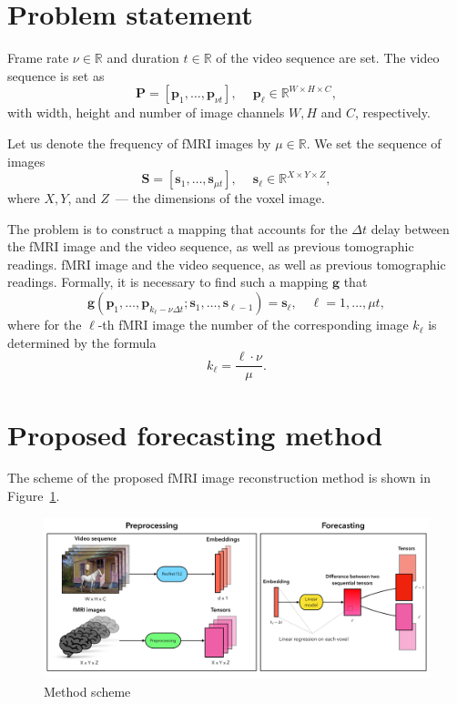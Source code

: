 \documentclass[sn-mathphys-num]{sn-jnl}%
\theoremstyle{thmstyleone}%
\theoremstyle{thmstyletwo}%
\theoremstyle{thmstylethree}%
\begin{document}
\section{Problem statement}

Frame rate $\nu \in \mathbb{R}$ and duration $t \in \mathbb{R}$ of the video sequence are set. The video sequence is set as
\begin{equation*}
	\label{eq1}
	\mathbf{P} = [\mathbf{p}_1, \ldots, \mathbf{p}_{\nu t}], \quad\
	\mathbf{p}_{\ell} \in \mathbb{R}^{W \times H \times C},
\end{equation*}
with width, height and number of image channels $W, H$ and $C$, respectively.

Let us denote the frequency of fMRI images by $\mu \in \mathbb{R}$. We set the sequence of images
\begin{equation*}
	\label{eq2}
	\mathbf{S} = [\mathbf{s}_1, \ldots, \mathbf{s}_{\mu t}], \quad\
	\mathbf{s}_{\ell} \in \mathbb{R}^{X \times Y \times Z},
\end{equation*}
where $X, Y$, and $Z$~--- the dimensions of the voxel image.

The problem is to construct a mapping that accounts for the $\Delta t$ delay between the fMRI image and the video sequence, as well as previous tomographic readings. fMRI image and the video sequence, as well as previous tomographic readings. Formally, it is necessary to find such a mapping $\mathbf{g}$ that
\begin{equation*}
	\label{eq3}
	\mathbf{g}(\mathbf{p}_1, \ldots, \mathbf{p}_{k_{\ell} - \nu \Delta t}; \mathbf{s}_1, \ldots, \mathbf{s}_{\ell-1}) = \mathbf{s}_{\ell}, \quad \ell = 1, \ldots, \mu t,
\end{equation*}
where for the $\ell$-th fMRI image the number of the corresponding image $k_{\ell}$ is determined by the formula
\begin{equation*}
	\label{eq4}
	k_{\ell} = \dfrac{\ell \cdot \nu}{\mu}.
\end{equation*}

\section{Proposed forecasting method}

The scheme of the proposed fMRI image reconstruction method is shown in Figure~\ref{fig:scheme}. 

\begin{figure}[h!]
	\centering
	\includegraphics[width=\textwidth]{scheme.pdf}
	\caption{Method scheme}
	\label{fig:scheme}
\end{figure}
\end{document}
